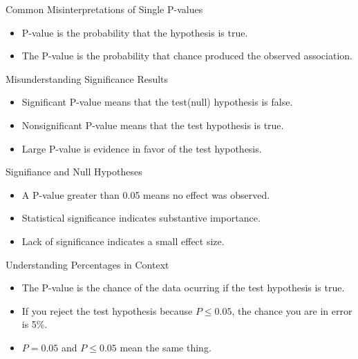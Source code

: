 \documentclass[aspectratio=169, 12pt]{beamer}
\begin{document}
\begin{frame}{Common Misinterpretations of Single P-values} %
\begin{itemize}
    \item P-value is the probability that the hypothesis is true.
    \vspace{0.5cm}
    \item The P-value is the probability that chance produced the observed association.
\end{itemize}
\end{frame}

\begin{frame}{Misunderstanding Significance Results} %
\begin{itemize}
    \item Significant P-value means that the test(null) hypothesis is false.
    \vspace{0.5cm}
    \item Nonsignificant P-value means that the test hypothesis is true.
    \vspace{0.5cm}
    \item Large P-value is evidence in favor of the test hypothesis.
\end{itemize}
\end{frame}

\begin{frame}{Signifiance and Null Hypotheses} %
\begin{itemize}
    \item A P-value greater than 0.05 means no effect was observed.
    \vspace{0.5cm}
    \item Statistical significance indicates substantive importance.
    \vspace{0.5cm}
    \item Lack of significance indicates a small effect size. 
\end{itemize}
\end{frame}

\begin{frame}{Understanding Percentages in Context} %
\begin{itemize}
    \item The P-value is the chance of the data ocurring if the test hypothesis is true.
    \vspace{0.5cm}
    \item If you reject the test hypothesis because \( P \leq 0.05 \), the chance you are in error is 5\%.
    \vspace{0.5cm}
    \item \( P = 0.05 \) and \( P \leq 0.05 \) mean the same thing.
\end{itemize}
\end{frame}
\end{document}
